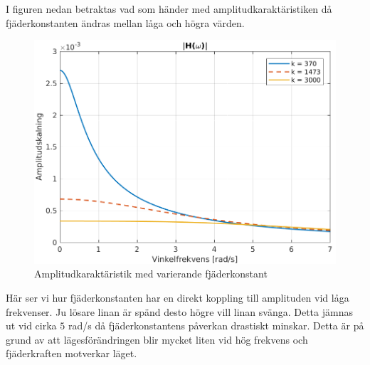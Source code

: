 \newpage
I figuren nedan betraktas vad som händer med amplitudkaraktäristiken då fjäderkonstanten ändras mellan låga och högra värden. 
\begin{figure}[H]
    \centering
    \includegraphics[scale=0.9]{bilder/amplitudkaraktaristik_variation_k}
    \caption{Amplitudkaraktäristik med varierande fjäderkonstant}
    \label{fig:amplitudkaraktaristik_variation_k}
\end{figure}
Här ser vi hur fjäderkonstanten har en direkt koppling till amplituden vid låga frekvenser. Ju lösare linan är spänd desto högre vill linan svänga. Detta jämnas ut vid cirka $5$ rad/s då fjäderkonstantens påverkan drastiskt minskar. Detta är på grund av att lägesförändringen blir mycket liten vid hög frekvens och fjäderkraften motverkar läget.

